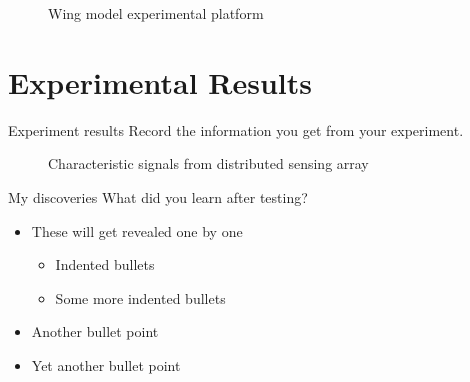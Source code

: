 \documentclass[aspectratio=169]{beamer}            %
\begin{document}
\begin{frame}[plain]
  \begin{figure}[!htb]
		\centering
		
		\caption{Wing model experimental platform}
		\label{Fig:ExpPlatform}
	\end{figure}
\end{frame}

\section{Experimental Results}
\begin{frame}[plain]{Experiment results}
  Record the information you get from your experiment.
	
	\begin{figure}[!htb]
		\centering
		\qquad
		\caption{Characteristic signals from distributed sensing array}
		\label{Fig:CharSignals}
	\end{figure}

\end{frame}

\begin{frame}{My discoveries}
	What did you learn after testing?
  \begin{itemize}[<+->]
  \item These will get revealed one by one
    \begin{itemize}
    \item Indented bullets
    \item Some more indented bullets
    \end{itemize}
  \item Another bullet point
  \item Yet another bullet point
  \end{itemize}
\end{frame}
\end{document}
